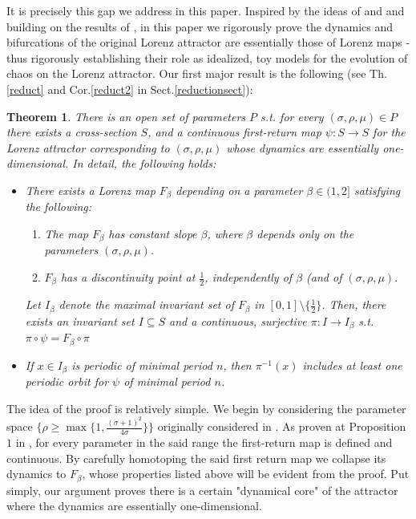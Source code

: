 \documentclass[10pt,reqno]{amsart}
\theoremstyle{plain}
\theoremstyle{assumption}
\theoremstyle{notation}
\theoremstyle{claim}
\theoremstyle{conj}
\theoremstyle{theorem}
\newtheorem{theorem}{Theorem}[section]
\theoremstyle{proposition}
\theoremstyle{corollary}
\begin{document}
It is precisely this gap we address in this paper. Inspired by the ideas of \cite{MK} and \cite{BS} and building on the results of \cite{Pi}, in this paper we rigorously prove the dynamics and bifurcations of the original Lorenz attractor are essentially those of Lorenz maps - thus rigorously establishing their role as idealized, toy models for the evolution of chaos on the Lorenz attractor. Our first major result is the following (see Th.\ref{reduct} and Cor.\ref{reduct2} in Sect.\ref{reductionsect}):
\begin{theorem}
    \label{first} There is an open set of parameters $P$ s.t. for every $(\sigma,\rho,\mu)\in P$ there exists a cross-section $S$, and a continuous first-return map $\psi:S\to S$ for the Lorenz attractor corresponding to $(\sigma,\rho,\mu)$ whose dynamics are essentially one-dimensional. In detail, the following holds:
    
    \begin{itemize}
        \item There exists a Lorenz map $F_\beta$ depending on a parameter $\beta\in(1,2]$ satisfying the following:
        \begin{enumerate}
            \item The map $F_\beta$ has constant slope $\beta$, where $\beta$ depends only on the parameters $(\sigma,\rho,\mu)$.
            \item $F_\beta$ has a discontinuity point at $\frac{1}{2}$, independently of $\beta$ (and of $(\sigma,\rho,\mu)$.
        \end{enumerate}
        
         Let $I_\beta$ denote the maximal invariant set of $F_\beta$ in $[0,1]\setminus\{\frac{1}{2}\}$. Then, there exists an invariant set $I\subseteq S$ and a continuous, surjective $\pi:I\to I_\beta$ s.t. $\pi\circ \psi=F_\beta\circ\pi$
        \item If $x\in I_\beta$ is periodic of minimal period $n$, then $\pi^{-1}(x)$ includes at least one periodic orbit for $\psi$ of minimal period $n$.
    \end{itemize}
    
\end{theorem}
The idea of the proof is relatively simple. We begin by considering the parameter space $\{\rho\geq\max\{1,\frac{(\sigma+1)^2}{4\sigma}\}\}$ originally considered in \cite{Pi}. As proven at Proposition $1$ in \cite{Pi}, for every parameter in the said range the first-return map is defined and continuous. By carefully homotoping the said first return map we collapse its dynamics to $F_\beta$, whose properties listed above will be evident from the proof. Put simply, our argument proves there is a certain "dynamical core" of the attractor where the dynamics are essentially one-dimensional. 
\end{document}
